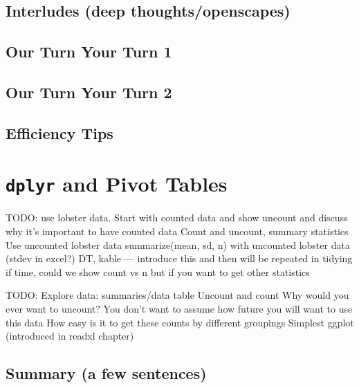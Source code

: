 \documentclass[]{book}
\begin{document}
\hypertarget{interludes-deep-thoughtsopenscapes-4}{%
\section{Interludes (deep thoughts/openscapes)}\label{interludes-deep-thoughtsopenscapes-4}}

\hypertarget{our-turn-your-turn-1-1}{%
\section{Our Turn Your Turn 1}\label{our-turn-your-turn-1-1}}

\hypertarget{our-turn-your-turn-2-1}{%
\section{Our Turn Your Turn 2}\label{our-turn-your-turn-2-1}}

\hypertarget{efficiency-tips-4}{%
\section{Efficiency Tips}\label{efficiency-tips-4}}

\hypertarget{pivot}{%
\chapter{\texorpdfstring{\texttt{dplyr} and Pivot Tables}{dplyr and Pivot Tables}}\label{pivot}}

TODO:
use lobster data.
Start with counted data and show uncount and discuss why it's important to have counted data
Count and uncount, summary statistics
Use uncounted lobster data
summarize(mean, sd, n) with uncounted lobster data (stdev in excel?)
DT, kable --- introduce this and then will be repeated in tidying
if time, could we show count vs n but if you want to get other statistics

TODO:
Explore data:
summaries/data table
Uncount and count
Why would you ever want to uncount? You don't want to assume how future you will want to use this data
How easy is it to get these counts by different groupings
Simplest ggplot (introduced in readxl chapter)

\hypertarget{summary-a-few-sentences}{%
\section{Summary (a few sentences)}\label{summary-a-few-sentences}}
\end{document}
